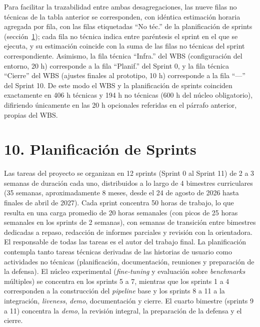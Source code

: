 \documentclass[
  11pt, %
]{charter}
\begin{document}
Para facilitar la trazabilidad entre ambas desagregaciones, las nueve filas no técnicas de la tabla anterior se corresponden, con idéntica estimación horaria agregada por fila, con las filas etiquetadas ``No téc.'' de la planificación de sprints (sección~\ref{sec:sprints}); cada fila no técnica indica entre paréntesis el sprint en el que se ejecuta, y su estimación coincide con la suma de las filas no técnicas del sprint correspondiente. Asimismo, la fila técnica ``Infra.'' del WBS (configuración del entorno, 20 h) corresponde a la fila ``Planif.'' del Sprint 0, y la fila técnica ``Cierre'' del WBS (ajustes finales al prototipo, 10 h) corresponde a la fila ``---'' del Sprint 10. De este modo el WBS y la planificación de sprints coinciden exactamente en 406 h técnicas y 194 h no técnicas (600 h del núcleo obligatorio), difiriendo únicamente en las 20 h opcionales referidas en el párrafo anterior, propias del WBS.

\section{10. Planificación de Sprints}
\label{sec:sprints}

Las tareas del proyecto se organizan en 12 sprints (Sprint 0 al Sprint 11) de 2 a 3 semanas de duración cada uno, distribuidos a lo largo de 4 bimestres curriculares (35 semanas, aproximadamente 8 meses, desde el 24 de agosto de 2026 hasta finales de abril de 2027). Cada sprint concentra 50 horas de trabajo, lo que resulta en una carga promedio de 20 horas semanales (con picos de 25 horas semanales en los sprints de 2 semanas), con semanas de transición entre bimestres dedicadas a repaso, redacción de informes parciales y revisión con la orientadora. El responsable de todas las tareas es el autor del trabajo final. La planificación contempla tanto tareas técnicas derivadas de las historias de usuario como actividades no técnicas (planificación, documentación, reuniones y preparación de la defensa). El núcleo experimental (\textit{fine-tuning} y evaluación sobre \textit{benchmarks} múltiples) se concentra en los sprints 5 a 7, mientras que los sprints 1 a 4 corresponden a la construcción del \textit{pipeline} base y los sprints 8 a 11 a la integración, \textit{liveness}, \textit{demo}, documentación y cierre. El cuarto bimestre (sprints 9 a 11) concentra la \textit{demo}, la revisión integral, la preparación de la defensa y el cierre.
\end{document}
